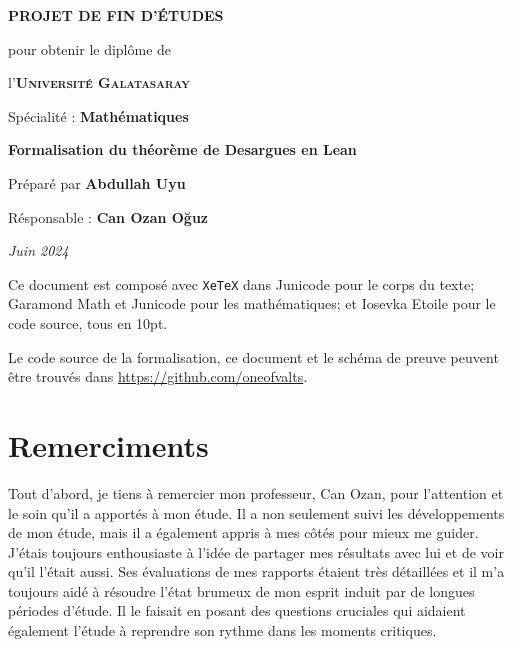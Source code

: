 \documentclass[fleqn, leqno, openright, oneside, 10pt]{memoir}
\makeatletter
\newcommand\iraggedright{%
  \let\\\@centercr\@rightskip\@flushglue \rightskip\@rightskip
  \leftskip\z@skip}
\theoremstyle{definition}
\theoremstyle{remark}
\makeatother
\begin{document}
\frontmatter
\pagestyle{empty}
\begin{center}
  \vspace*{\fill}
  

  \vspace{1cm}
  \large{\textbf{PROJET DE FIN D'ÉTUDES}}

  \vspace{0.5cm}
  {\small pour obtenir le diplôme de}

  \vspace{0.5cm}
  l'\textsc{\textbf{Université Galatasaray}}

  {\small Spécialité : \textbf{Mathématiques}}

  \vspace{0.75cm}
  {\Large\textbf{Formalisation du théorème de Desargues en Lean}}

  \vspace{0.75cm}
  Préparé par \textbf{Abdullah Uyu}

  Résponsable : \textbf{Can Ozan Oğuz}

  \vspace*{\fill}
  \textit{Juin 2024}
  \vspace*{\fill}
\end{center}
\iraggedright
\raggedbottom
\clearpage
\null{}
\vfill{}
Ce document est composé avec \texttt{XeTeX} dans Junicode pour le corps du
texte; Garamond Math et Junicode pour les mathématiques; et Iosevka Etoile pour le code
source, tous en 10pt.

Le code source de la formalisation, ce document et le schéma de preuve
peuvent être trouvés dans \url{https://github.com/oneofvalts}.
\chapter*{Remerciments}
Tout d'abord, je tiens à remercier mon professeur, Can Ozan, pour
l'attention et le soin qu'il a apportés à mon étude. Il a non seulement
suivi les développements de mon étude, mais il a également appris à mes
côtés pour mieux me guider. J'étais toujours enthousiaste à l'idée de
partager mes résultats avec lui et de voir qu'il l'était aussi. Ses
évaluations de mes rapports étaient très détaillées et il m'a toujours
aidé à résoudre l'état brumeux de mon esprit induit par de longues
périodes d'étude. Il le faisait en posant des questions cruciales qui
aidaient également l'étude à reprendre son rythme dans les moments
critiques.
\end{document}
